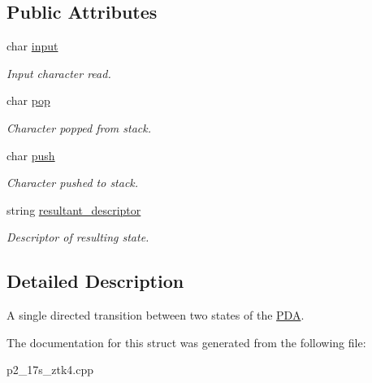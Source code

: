 \subsection*{Public Attributes}
\begin{DoxyCompactItemize}
\item 
char \hyperlink{structPDA_1_1Transition_a5bc09abbf91e19148cd5e2ee90260644}{input}\hypertarget{structPDA_1_1Transition_a5bc09abbf91e19148cd5e2ee90260644}{}\label{structPDA_1_1Transition_a5bc09abbf91e19148cd5e2ee90260644}

\begin{DoxyCompactList}\small\item\em Input character read. \end{DoxyCompactList}\item 
char \hyperlink{structPDA_1_1Transition_a79b0f2480fe10528675ccfbfb43496c8}{pop}\hypertarget{structPDA_1_1Transition_a79b0f2480fe10528675ccfbfb43496c8}{}\label{structPDA_1_1Transition_a79b0f2480fe10528675ccfbfb43496c8}

\begin{DoxyCompactList}\small\item\em Character popped from stack. \end{DoxyCompactList}\item 
char \hyperlink{structPDA_1_1Transition_a26b034e7feea15822dd0155b4420f677}{push}\hypertarget{structPDA_1_1Transition_a26b034e7feea15822dd0155b4420f677}{}\label{structPDA_1_1Transition_a26b034e7feea15822dd0155b4420f677}

\begin{DoxyCompactList}\small\item\em Character pushed to stack. \end{DoxyCompactList}\item 
string \hyperlink{structPDA_1_1Transition_a6492d2df8ace6be2e84ec84b75d7bce5}{resultant\+\_\+descriptor}\hypertarget{structPDA_1_1Transition_a6492d2df8ace6be2e84ec84b75d7bce5}{}\label{structPDA_1_1Transition_a6492d2df8ace6be2e84ec84b75d7bce5}

\begin{DoxyCompactList}\small\item\em Descriptor of resulting state. \end{DoxyCompactList}\end{DoxyCompactItemize}


\subsection{Detailed Description}
A single directed transition between two states of the \hyperlink{classPDA}{P\+DA}. 

The documentation for this struct was generated from the following file\+:\begin{DoxyCompactItemize}
\item 
p2\+\_\+17s\+\_\+ztk4.\+cpp\end{DoxyCompactItemize}
